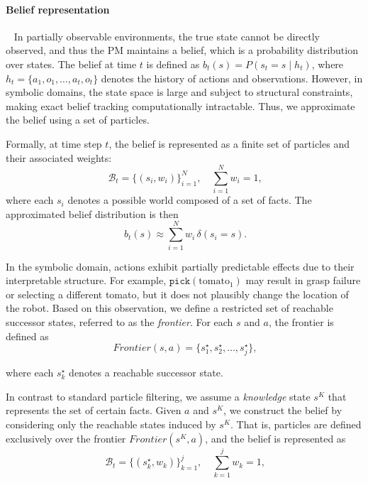 \paragraph{Belief representation}~\label{method:belief_rep}
In partially observable environments, the true state cannot be directly observed, and thus the PM maintains a belief, which is a probability distribution over states. The belief at time $t$ is defined as $b_t(s) = P(s_t = s \mid h_t)$, where $h_t = \{a_1, o_1, \dots, a_t, o_t \}$ denotes the history of actions and observations. However, in symbolic domains, the state space is large and subject to structural constraints, making exact belief tracking computationally intractable. Thus, we approximate the belief using a set of particles.

Formally, at time step $t$, the belief is represented as a finite set of particles and their associated weights:
\begin{equation}~\label{eq:particles}
\mathcal{B}_t = \{ (s_i, w_i) \}_{i=1}^{N}, \quad \sum_{i=1}^{N} w_i = 1,
\end{equation}
where each $s_i$ denotes a possible world composed of a set of facts. The approximated belief distribution is then
\begin{equation}~\label{eq:particles_approx}
b_t(s) \approx \sum_{i=1}^{N} w_i \, \delta(s_i = s).
\end{equation}

In the symbolic domain, actions exhibit partially predictable effects due to their interpretable structure. For example, $\texttt{pick}(\text{tomato}_1)$ may result in grasp failure or selecting a different tomato, but it does not plausibly change the location of the robot. Based on this observation, we define a restricted set of reachable successor states, referred to as the \textit{frontier}. For each $s$ and $a$, the frontier is defined as
\begin{equation}~\label{eq:frontier}
Frontier(s,a) = \{ s_1^{\star}, s_2^{\star}, \dots, s_j^{\star} \},
\end{equation}

where each $s_k^{\star}$ denotes a reachable successor state.

In contrast to standard particle filtering, we assume a \textit{knowledge} state $s^{K}$ that represents the set of certain facts. Given $a$ and $s^{K}$, we construct the belief by considering only the reachable states induced by $s^{K}$. That is, particles are defined exclusively over the frontier $Frontier(s^{K}, a)$, and the belief is represented as
\begin{equation}~\label{eq:transition_belief}
\mathcal{B}_t = \{ (s_k^{\star}, w_k) \}_{k=1}^{j}, \quad \sum_{k=1}^{j} w_k = 1,
\end{equation}


